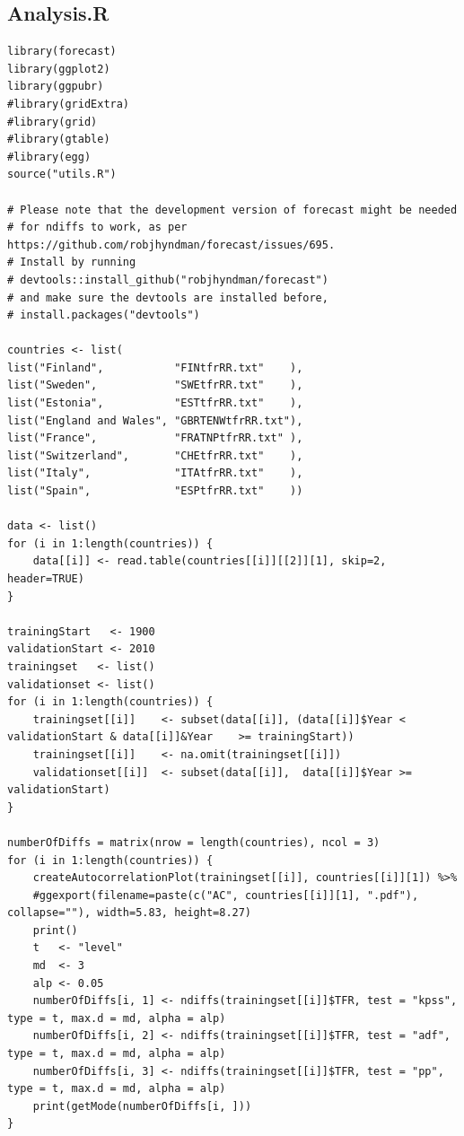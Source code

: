 \documentclass[a4paper, 12pt]{scrartcl}
\begin{document}
\subsection{Analysis.R}
\begin{lstlisting}[caption={The main code used for the analysis, requires the \texttt{utils.R} file with help functions for IO to be present. Some parts of the code left commented, mostly ones used to write data to disk.}]
library(forecast)
library(ggplot2)
library(ggpubr)
#library(gridExtra)
#library(grid)
#library(gtable)
#library(egg)
source("utils.R")

# Please note that the development version of forecast might be needed
# for ndiffs to work, as per https://github.com/robjhyndman/forecast/issues/695.
# Install by running
# devtools::install_github("robjhyndman/forecast")
# and make sure the devtools are installed before,
# install.packages("devtools")

countries <- list(
list("Finland",           "FINtfrRR.txt"    ),
list("Sweden",            "SWEtfrRR.txt"    ),
list("Estonia",           "ESTtfrRR.txt"    ),
list("England and Wales", "GBRTENWtfrRR.txt"),
list("France",            "FRATNPtfrRR.txt" ),
list("Switzerland",       "CHEtfrRR.txt"    ),
list("Italy",             "ITAtfrRR.txt"    ),
list("Spain",             "ESPtfrRR.txt"    ))

data <- list()
for (i in 1:length(countries)) {
	data[[i]] <- read.table(countries[[i]][[2]][1], skip=2, header=TRUE)
}

trainingStart   <- 1900
validationStart <- 2010
trainingset   <- list()
validationset <- list()
for (i in 1:length(countries)) {
	trainingset[[i]]	<- subset(data[[i]], (data[[i]]$Year <  validationStart & data[[i]]&Year	>= trainingStart))
	trainingset[[i]]	<- na.omit(trainingset[[i]])
	validationset[[i]]	<- subset(data[[i]],  data[[i]]$Year >= validationStart)
}

numberOfDiffs = matrix(nrow = length(countries), ncol = 3)
for (i in 1:length(countries)) {
	createAutocorrelationPlot(trainingset[[i]], countries[[i]][1]) %>%
	#ggexport(filename=paste(c("AC", countries[[i]][1], ".pdf"), collapse=""), width=5.83, height=8.27)
	print()
	t   <- "level"
	md  <- 3
	alp <- 0.05
	numberOfDiffs[i, 1] <- ndiffs(trainingset[[i]]$TFR, test = "kpss", type = t, max.d = md, alpha = alp)
	numberOfDiffs[i, 2] <- ndiffs(trainingset[[i]]$TFR, test = "adf",  type = t, max.d = md, alpha = alp)
	numberOfDiffs[i, 3] <- ndiffs(trainingset[[i]]$TFR, test = "pp",   type = t, max.d = md, alpha = alp)
	print(getMode(numberOfDiffs[i, ]))
}


\end{lstlisting}
\end{document}

